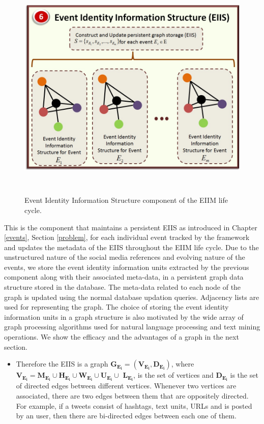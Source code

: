 \begin{figure}[htbp]
  \caption{Event Identity Information Structure component of the EIIM life cycle.}
  \centering
    \includegraphics[width=14cm,height=11cm]{Figures/EIIS.jpg}
\end{figure}

This is the component that maintains a persistent EIIS as introduced in Chapter \ref{events}, Section \ref{problem}, for each individual event tracked by the framework and updates the metadata of the EIIS throughout the EIIM life cycle. Due to the unstructured nature of the social media references and evolving nature of the events, we store the event identity information units extracted by the previous component along with their associated meta-data, in a persistent graph data structure stored in the database. The meta-data related to each node of the graph is updated using the normal database updation queries. Adjacency lists are used for representing the graph. The choice of storing the event identity information units in a graph structure is also motivated by the wide array of graph processing algorithms used for natural language processing and text mining operations. We show the efficacy and the advantages of a graph in the next section. 

\begin{itemize}
\item Therefore the EIIS is a graph $\mathbf{G_{E_{i}} = (V_{E_{i}},D_{E_{i}})}$, where \\ $\mathbf{V_{E_{i}} = M_{E_{i}} \cup H_{E_{i}} \cup W_{E_{i}} \cup U_{E_{i}} \cup}$ $\mathbf{L_{E_{i}}}$, is the set of vertices and $\mathbf{D_{E_{i}}}$ is the set of directed edges between different vertices. Whenever two vertices are associated, there are two edges between them that are oppositely directed. For example, if a tweets consist of hashtags, text units, URLs and is posted by an user, then there are bi-directed edges between each one of them. 
\end{itemize}








